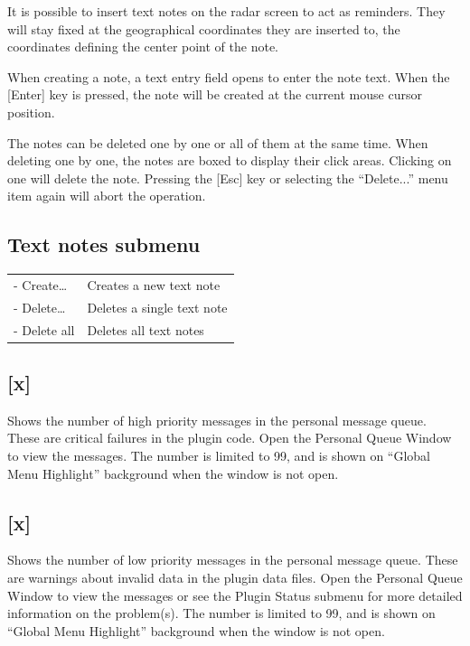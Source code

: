 \documentclass[11pt,a4paper,oldfontcommands]{memoir}
\begin{document}
\medskip

It is possible to insert text notes on the radar screen to act as reminders. They will stay fixed at the
geographical coordinates they are inserted to, the coordinates defining the center point of the note.

When creating a note, a text entry field opens to enter the note text. When the [Enter] key is pressed, the
note will be created at the current mouse cursor position.

The notes can be deleted one by one or all of them at the same time. When deleting one by one, the notes
are boxed to display their click areas. Clicking on one will delete the note. Pressing the [Esc] key or selecting
the “Delete...” menu item again will abort the operation.

\subsection*{Text notes submenu}
\begin{tabular}{l l}
\\- Create…     & Creates a new text note
\\- Delete…     & Deletes a single text note
\\- Delete all  & Deletes all text notes
\end{tabular}

\medskip

\subsection{[x]}
Shows the number of high priority messages in the personal message queue. These are critical failures in
the plugin code. Open the Personal Queue Window to view the messages. The number is limited to 99, and
is shown on “Global Menu Highlight” background when the window is not open.

\subsection{[x]}
Shows the number of low priority messages in the personal message queue. These are warnings about
invalid data in the plugin data files. Open the Personal Queue Window to view the messages or see the
Plugin Status submenu for more detailed information on the problem(s). The number is limited to 99, and is
shown on “Global Menu Highlight” background when the window is not open.
\end{document}

